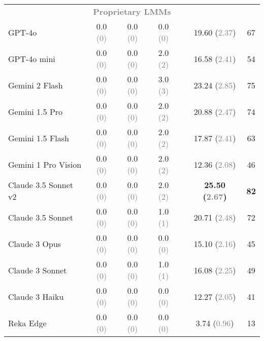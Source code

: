 \begin{table*}[t]
\begin{tabular}{lcccccc}
\multicolumn{7}{c}{\textcolor{gray}{\textbf{Proprietary LMMs}}} \\
GPT-4o & 0.0 \textcolor{gray}{(0)} & 0.0 \textcolor{gray}{(0)} & 0.0 \textcolor{gray}{(0)} &  & 19.60 (\textcolor{gray}{2.37}) & 67 \\
GPT-4o mini & 0.0 \textcolor{gray}{(0)} & 0.0 \textcolor{gray}{(0)} & 2.0 \textcolor{gray}{(2)} &  & 16.58 (\textcolor{gray}{2.41}) & 54 \\
Gemini 2 Flash & 0.0 \textcolor{gray}{(0)} & 0.0 \textcolor{gray}{(0)} & 3.0 \textcolor{gray}{(3)} &  & 23.24 (\textcolor{gray}{2.85}) & 75 \\
Gemini 1.5 Pro & 0.0 \textcolor{gray}{(0)} & 0.0 \textcolor{gray}{(0)} & 2.0 \textcolor{gray}{(2)} &  & 20.88 (\textcolor{gray}{2.47}) & 74 \\
Gemini 1.5 Flash & 0.0 \textcolor{gray}{(0)} & 0.0 \textcolor{gray}{(0)} & 2.0 \textcolor{gray}{(2)} &  & 17.87 (\textcolor{gray}{2.41}) & 63 \\
Gemini 1 Pro Vision & 0.0 \textcolor{gray}{(0)} & 0.0 \textcolor{gray}{(0)} & 2.0 \textcolor{gray}{(2)} &  & 12.36 (\textcolor{gray}{2.08}) & 46 \\
Claude 3.5 Sonnet v2 & 0.0 \textcolor{gray}{(0)} & 0.0 \textcolor{gray}{(0)} & 2.0 \textcolor{gray}{(2)} &  & \textbf{25.50 (\textcolor{gray}{2.67})} & \textbf{82} \\
Claude 3.5 Sonnet & 0.0 \textcolor{gray}{(0)} & 0.0 \textcolor{gray}{(0)} & 1.0 \textcolor{gray}{(1)} &  & 20.71 (\textcolor{gray}{2.48}) & 72 \\
Claude 3 Opus & 0.0 \textcolor{gray}{(0)} & 0.0 \textcolor{gray}{(0)} & 0.0 \textcolor{gray}{(0)} &  & 15.10 (\textcolor{gray}{2.16}) & 45 \\
Claude 3 Sonnet & 0.0 \textcolor{gray}{(0)} & 0.0 \textcolor{gray}{(0)} & 1.0 \textcolor{gray}{(1)} &  & 16.08 (\textcolor{gray}{2.25}) & 49 \\
Claude 3 Haiku & 0.0 \textcolor{gray}{(0)} & 0.0 \textcolor{gray}{(0)} & 0.0 \textcolor{gray}{(0)} &  & 12.27 (\textcolor{gray}{2.05}) & 41 \\
Reka Edge & 0.0 \textcolor{gray}{(0)} & 0.0 \textcolor{gray}{(0)} & 0.0 \textcolor{gray}{(0)} &  & 3.74 (\textcolor{gray}{0.96}) & 13 \\
\midrule


\end{tabular}
\end{table*}
